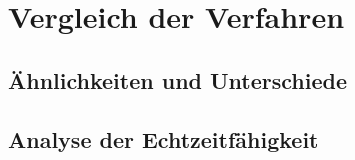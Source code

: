 \chapter{Vergleich der Verfahren}

\section{Ähnlichkeiten und Unterschiede}

\section{Analyse der Echtzeitfähigkeit}



